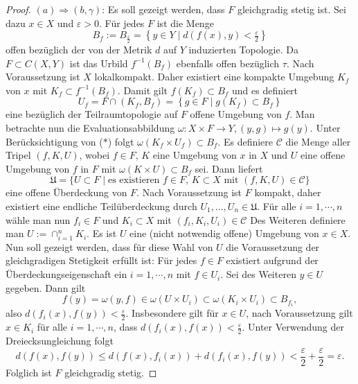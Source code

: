 \begin{proof}
  $(a) \Rightarrow (b, \gamma)$:
  Es soll gezeigt werden, dass $F$ gleichgradig stetig ist.
  Sei dazu $x \in X$ und $\varepsilon > 0$.
  Für jedes $F$ ist die Menge
  \begin{displaymath}
    B_f := B_{\frac{\varepsilon}{2}} = \left\{ y \in Y \mid d(f(x),y) < \tfrac{\varepsilon}{2}\right\} 
  \end{displaymath}
  offen bezüglich der von der Metrik $d$ auf $Y$ induzierten Topologie.
  Da $F \subset C(X,Y)$ ist das Urbild $f^{-1}(B_f)$ ebenfalls offen bezüglich $\tau$.
  Nach Voraussetzung ist $X$ lokalkompakt.
  Daher existiert eine kompakte Umgebung $K_f$ von $x$ mit $K_f \subset f^{-1}(B_f)$.
  Damit gilt $f(K_f) \subset B_f$ und es definiert
  \begin{displaymath}
    U_f = F \cap (K_f, B_f) = \left\{g \in F \mid g(K_f) \subset B_f \right\} \tag{$\ast$}
  \end{displaymath}
  eine bezüglich der Teilraumtopologie auf $F$ offene Umgebung von $f$.
  Man betrachte nun die Evaluationsabbildung $\omega: X \times F \to Y, (y,g) \mapsto g(y)$.
  Unter Berücksichtigung von ($\ast$) folgt $\omega(K_f \times U_f) \subset B_f$.
  Es definiere $\mathcal{C}$ die Menge aller Tripel $(f,K,U)$, wobei $f \in F$, $K$ eine Umgebung von $x$ in $X$ und $U$ eine offene Umgebung von $f$ in $F$ mit $\omega(K \times U) \subset B_f$ sei.
  Dann liefert
  \begin{displaymath}
    \mathfrak{U} = \{ U \subset F \mid \text{es existieren $f \in F$, $K \subset X$ mit $(f,K,U) \in \mathcal C$} \}
  \end{displaymath}
  eine offene Überdeckung von $F$.
  Nach Voraussetzung ist $F$ kompakt, daher existiert eine endliche Teilüberdeckung durch $U_1,\dots,U_n \in \mathfrak{U}$.
  Für alle $i = 1,\cdots,n$ wähle man nun $f_i \in F$ und $K_i \subset X$ mit $(f_i, K_i, U_i) \in \mathcal{C}$
  Des Weiteren definiere man $U := \cap_{i = 1}^n K_i$.
  Es ist $U$ eine (nicht notwendig offene) Umgebung von $x \in X$.
  Nun soll gezeigt werden, dass für diese Wahl von $U$ die Voraussetzung der gleichgradigen Stetigkeit erfüllt ist:
  Für jedes $f \in F$ existiert aufgrund der Überdeckungseigenschaft ein $i = 1,\cdots,n$ mit $f \in U_i$.
  Sei des Weiteren $y \in U$ gegeben.
  Dann gilt
  \begin{displaymath}
    f(y) = \omega(y,f) \in \omega(U \times U_i) \subset \omega(K_i \times U_i) \subset B_{f_i},
  \end{displaymath}
  also $d(f_i(x),f(y)) < \tfrac{\varepsilon}{2}$.
  Insbesondere gilt für $x \in U$, nach Voraussetzung gilt $x \in K_i$ für alle $i = 1,\cdots,n$, dass $d(f_i(x),f(x)) < \tfrac{\varepsilon}{2}$.
  Unter Verwendung der Dreiecksungleichung folgt
  \begin{displaymath}
    d(f(x),f(y)) \leq d(f(x),f_i(x)) + d(f_i(x),f(y)) < \frac{\varepsilon}{2} + \frac{\varepsilon}{2} = \varepsilon.
  \end{displaymath}
  Folglich ist $F$ gleichgradig stetig.


\end{proof}
